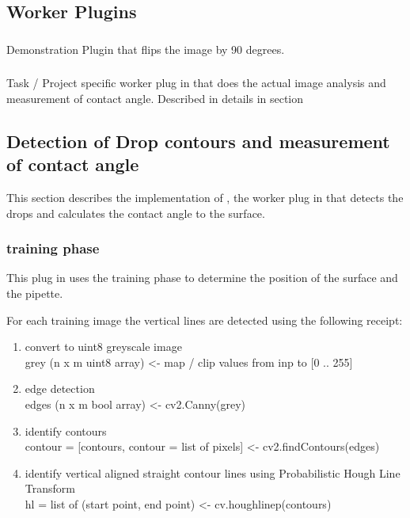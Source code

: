 \subsection{Worker Plugins}

\subsubsection[wrkInvert]{}
Demonstration Plugin that flips the image by 90 degrees.

\subsubsection[wrkEdgeFit]{}
Task / Project specific worker plug in that does the actual image analysis and measurement of contact angle.
Described in details in section 



\subsection{Detection of Drop contours and measurement of contact angle}
This section describes the implementation of , the worker plug in that detects the drops and calculates the contact angle to the surface.


\subsubsection{training phase}

This plug in uses the training phase to determine the position of the surface and the pipette.

For each training image the vertical lines are detected using the following receipt:

\begin{enumerate}
	\item convert to uint8 greyscale image\\
        grey (n x m uint8 array) <- map / clip values from inp to [0 .. 255]
  \item edge detection\\
        edges (n x m bool array) <- cv2.Canny(grey)
  \item identify contours\\
        contour = [contours, contour = list of pixels] <- cv2.findContours(edges)
  \item identify vertical aligned straight contour lines using Probabilistic Hough Line Transform\\
        hl = list of (start point, end point) <- cv.houghlinep(contours)
\end{enumerate}

